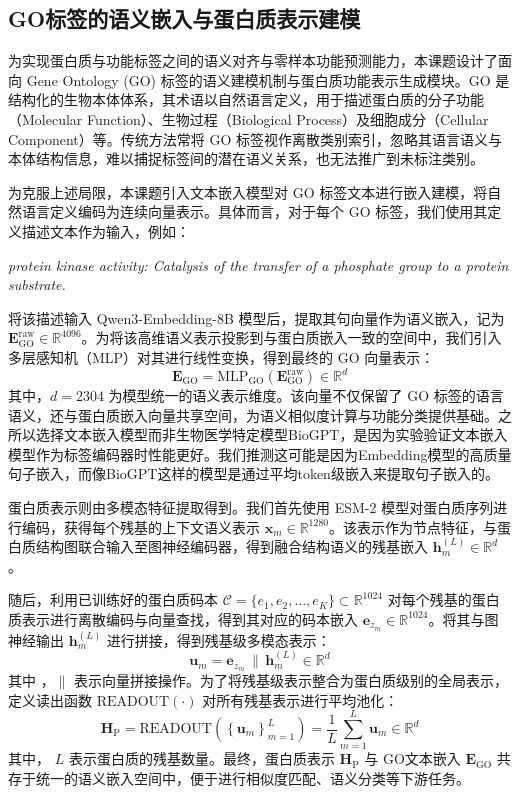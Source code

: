 \subsection{GO标签的语义嵌入与蛋白质表示建模}
为实现蛋白质与功能标签之间的语义对齐与零样本功能预测能力，本课题设计了面向 Gene Ontology (GO) 标签的语义建模机制与蛋白质功能表示生成模块。GO 是结构化的生物本体体系，其术语以自然语言定义，用于描述蛋白质的分子功能（Molecular Function）、生物过程（Biological Process）及细胞成分（Cellular Component）等。传统方法常将 GO 标签视作离散类别索引，忽略其语言语义与本体结构信息，难以捕捉标签间的潜在语义关系，也无法推广到未标注类别。

为克服上述局限，本课题引入文本嵌入模型对 GO 标签文本进行嵌入建模，将自然语言定义编码为连续向量表示。具体而言，对于每个 GO 标签，我们使用其定义描述文本作为输入，例如：

\textit{protein kinase activity: Catalysis of the transfer of a phosphate group to a protein substrate.}

将该描述输入 Qwen3-Embedding-8B 模型后，提取其句向量作为语义嵌入，记为 $\mathbf{E}_{\text{GO}}^{\text{raw}} \in \mathbb{R}^{4096}$。为将该高维语义表示投影到与蛋白质嵌入一致的空间中，我们引入多层感知机（MLP）对其进行线性变换，得到最终的 GO 向量表示：
\begin{equation}
\mathbf{E}_{\text{GO}} = \text{MLP}_{\text{GO}}(\mathbf{E}_{\text{GO}}^{\text{raw}}) \in \mathbb{R}^{d}
\end{equation}
其中，$d=2304$ 为模型统一的语义表示维度。该向量不仅保留了 GO 标签的语言语义，还与蛋白质嵌入向量共享空间，为语义相似度计算与功能分类提供基础。之所以选择文本嵌入模型而非生物医学特定模型BioGPT，是因为实验验证文本嵌入模型作为标签编码器时性能更好。我们推测这可能是因为Embedding模型的高质量句子嵌入，而像BioGPT这样的模型是通过平均token级嵌入来提取句子嵌入的。

蛋白质表示则由多模态特征提取得到。我们首先使用 ESM-2 模型对蛋白质序列进行编码，获得每个残基的上下文语义表示 $\mathbf{x}_m \in \mathbb{R}^{1280}$。该表示作为节点特征，与蛋白质结构图联合输入至图神经编码器，得到融合结构语义的残基嵌入 $\mathbf{h}_m^{(L)} \in \mathbb{R}^{d}$。

随后，利用已训练好的蛋白质码本 $\mathcal{C} = \{e_1, e_2, \ldots, e_K\} \subset \mathbb{R}^{1024}$ 对每个残基的蛋白质表示进行离散编码与向量查找，得到其对应的码本嵌入 $\mathbf{e}_{z_m} \in \mathbb{R}^{1024}$。将其与图神经输出 $\mathbf{h}_m^{(L)}$ 进行拼接，得到残基级多模态表示：
\begin{equation}
\mathbf{u}_m = \mathbf{e}_{z_m} \, \| \, \mathbf{h}_m^{(L)} \in \mathbb{R}^{d}
\end{equation}
其中 ，$\|$ 表示向量拼接操作。为了将残基级表示整合为蛋白质级别的全局表示，定义读出函数 $\text{READOUT}(\cdot)$ 对所有残基表示进行平均池化：
\begin{equation}
\mathbf{H}_{\text{P}} = \text{READOUT} \left( \left\{ \mathbf{u}_m \right\}_{m=1}^{L} \right) = \frac{1}{L} \sum_{m=1}^{L} \mathbf{u}_m \in \mathbb{R}^{d}
\end{equation}
其中， $L$ 表示蛋白质的残基数量。最终，蛋白质表示 $\mathbf{H}_{\text{P}}$ 与 GO文本嵌入 $\mathbf{E}_{\text{GO}}$ 共存于统一的语义嵌入空间中，便于进行相似度匹配、语义分类等下游任务。



